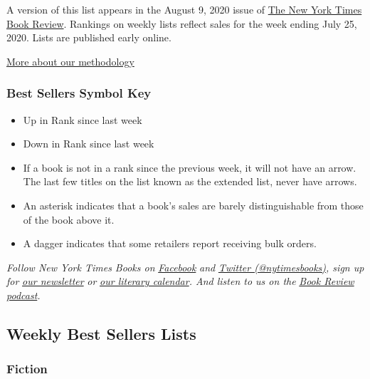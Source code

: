 A version of this list appears in the August 9, 2020 issue of
\href{http://www.nytimes3xbfgragh.onion/section/books/review}{The New
York Times Book Review}. Rankings on weekly lists reflect sales for the
week ending July 25, 2020. Lists are published early online.

\href{/books/best-sellers/methodology/}{More about our methodology}

\hypertarget{best-sellers-symbol-key}{%
\subsubsection{Best Sellers Symbol Key}\label{best-sellers-symbol-key}}

\begin{itemize}
\item
  Up in Rank since last week
\item
  Down in Rank since last week
\item
  If a book is not in a rank since the previous week, it will not have
  an arrow. The last few titles on the list known as the extended list,
  never have arrows.
\item
  An asterisk indicates that a book's sales are barely distinguishable
  from those of the book above it.
\item
  A dagger indicates that some retailers report receiving bulk orders.
\end{itemize}

\emph{Follow New York Times Books on}
\href{https://www.facebookcorewwwi.onion/nytbooks/}{\emph{Facebook}}
\emph{and} \href{https://twitter.com/nytimesbooks}{\emph{Twitter
(@nytimesbooks)}}\emph{, sign up for}
\href{https://www.nytimes3xbfgragh.onion/newsletters/books-review}{\emph{our
newsletter}} \emph{or}
\href{https://www.nytimes3xbfgragh.onion/interactive/2017/books/books-calendar.html}{\emph{our
literary calendar}}\emph{. And listen to us on the}
\href{https://www.nytimes3xbfgragh.onion/column/book-review-podcast}{\emph{Book
Review podcast}}\emph{.}

\hypertarget{weekly-best-sellers-lists}{%
\subsection{Weekly Best Sellers Lists}\label{weekly-best-sellers-lists}}

\hypertarget{fiction}{%
\subsubsection{Fiction}\label{fiction}}

